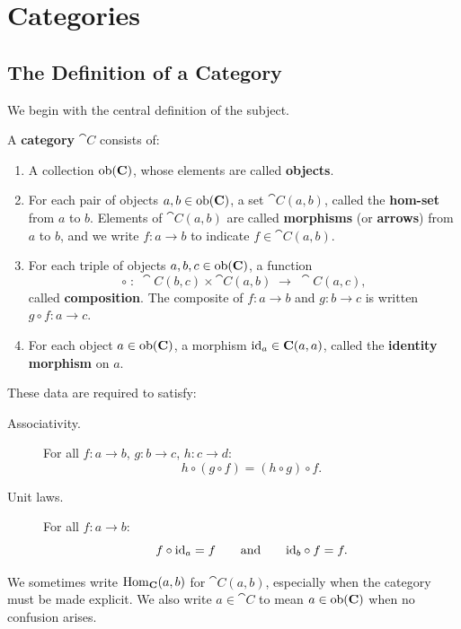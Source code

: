 \chapter{Categories}
\label{ch:categories}

\section{The Definition of a Category}

We begin with the central definition of the subject.

\begin{definition}[Category]
A \textbf{category} $\cat{C}$ consists of:
\begin{enumerate}
  \item A collection $\operatorname{ob}(\mathbf{C})$, whose elements are called \textbf{objects}.
  \item For each pair of objects $a, b \in \operatorname{ob}(\mathbf{C})$, a set $\cat{C}(a,b)$, called the \textbf{hom-set} from $a$ to $b$. Elements of $\cat{C}(a,b)$ are called \textbf{morphisms} (or \textbf{arrows}) from $a$ to $b$, and we write $f: a \to b$ to indicate $f \in \cat{C}(a,b)$.
  \item For each triple of objects $a, b, c \in \operatorname{ob}(\mathbf{C})$, a function
  \[
    \circ \;:\; \cat{C}(b,c) \times \cat{C}(a,b) \;\longrightarrow\; \cat{C}(a,c),
  \]
  called \textbf{composition}. The composite of $f: a \to b$ and $g: b \to c$ is written $g \circ f: a \to c$.
  \item For each object $a \in \operatorname{ob}(\mathbf{C})$, a morphism $\mathrm{id}_a \in \mathbf{C}(a,a)$, called the \textbf{identity morphism} on $a$.
\end{enumerate}
These data are required to satisfy:
\begin{description}
  \item[Associativity.] For all $f: a \to b$, $g: b \to c$, $h: c \to d$:
  \[
    h \circ (g \circ f) = (h \circ g) \circ f.
  \]
  \item[Unit laws.] For all $f: a \to b$:
  \[
    f \circ \mathrm{id}_a = f \qquad \text{and} \qquad \mathrm{id}_b \circ f = f.
  \]
\end{description}
\end{definition}

\begin{remark}
We sometimes write $\operatorname{Hom}_{\mathbf{C}}(a,b)$ for $\cat{C}(a,b)$, especially when the category must be made explicit.  We also write $a \in \cat{C}$ to mean $a \in \operatorname{ob}(\mathbf{C})$ when no confusion arises.
\end{remark}

